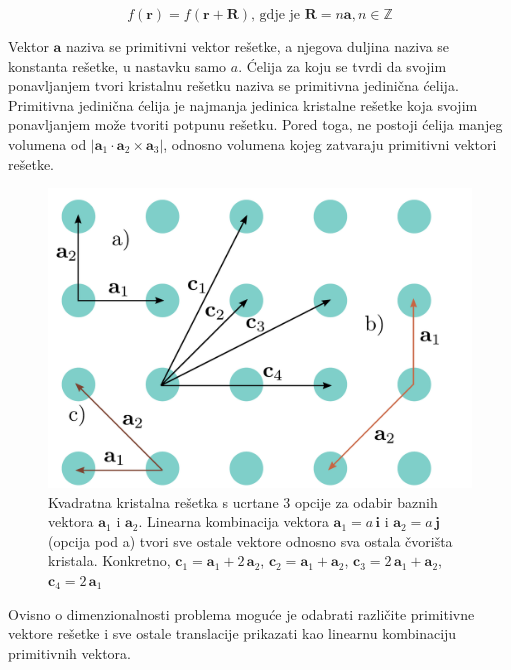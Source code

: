 \documentclass[utf8, seminar, numeric]{fer}
\begin{document}
\begin{equation}
	f(\mathbf{r}) = f(\mathbf{r} + \mathbf{R}) \text{, gdje je }{\mathbf{R} =
	n\mathbf{a}}, n \in \mathbb{Z}
\end{equation}

Vektor $\mathbf{a}$ naziva se primitivni vektor rešetke, a njegova duljina
naziva se konstanta rešetke, u nastavku samo $a$. Ćelija za koju se tvrdi
da svojim ponavljanjem tvori kristalnu rešetku naziva se primitivna jedinična
ćelija. Primitivna jedinična ćelija je najmanja jedinica kristalne rešetke koja
svojim ponavljanjem može tvoriti potpunu rešetku. Pored toga, ne postoji ćelija
manjeg volumena od ${|\mathbf{a}_1 \cdot \mathbf{a}_2 \times \mathbf{a}_3|}$,
odnosno volumena kojeg zatvaraju primitivni vektori rešetke.

\begin{figure}[ht]
	\centering
	\includegraphics[width = 1.0\linewidth]{./images/pdf/crystal_lattice.pdf}
	\caption{Kvadratna kristalna rešetka s ucrtane 3 opcije za odabir baznih
	vektora $\mathbf{a}_1$ i $\mathbf{a}_2$. Linearna kombinacija vektora
	$\mathbf{a}_1 = a \, \mathbf{i}$ i $\mathbf{a}_2 = a \, \mathbf{j}$ (opcija
	pod a) tvori sve ostale vektore odnosno sva ostala čvorišta kristala.
	Konkretno,
	${\mathbf{c}_1 = \mathbf{a}_1 + 2 \, \mathbf{a}_2}$,
	${\mathbf{c}_2 = \mathbf{a}_1 + \mathbf{a}_2}$,
	${\mathbf{c}_3 = 2 \, \mathbf{a}_1 + \mathbf{a}_2}$,
	${\mathbf{c}_4 = 2 \, \mathbf{a}_1}$}
	\label{fig:crystal_lattice}
\end{figure}

Ovisno o dimenzionalnosti problema moguće je odabrati različite primitivne
vektore rešetke i sve ostale translacije prikazati kao linearnu kombinaciju
primitivnih vektora.
\end{document}
